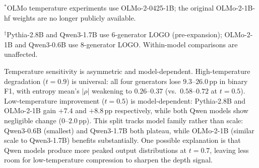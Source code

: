 \begin{table}[ht]
\centering
\caption{Depth classification under varying temperature (fixed top-$p$\,=\,0.9). Binary: gen-1 vs.\ gen-2+. LOGO evaluation; 95\% bootstrap CIs.$^{\ast}$$^{\dagger}$}
\label{tab:sampling-ablation}
\small
{}
\end{table}
\noindent\begin{minipage}{\columnwidth}
\scriptsize $^{\ast}$OLMo temperature experiments use OLMo-2-0425-1B; the original OLMo-2-1B-hf weights are no longer publicly available.\par\vspace{1pt}
$^{\dagger}$Pythia-2.8B and Qwen3-1.7B use 6-generator LOGO (pre-expansion); OLMo-2-1B and Qwen3-0.6B use 8-generator LOGO. Within-model comparisons are unaffected.
\end{minipage}\vspace{4pt}

 Temperature sensitivity is asymmetric and model-dependent. High-temperature degradation ($t{=}0.9$) is universal: all four generators lose $9.3$--$26.0$\,pp in binary F1, with entropy mean's $|\rho|$ weakening to $0.26$--$0.37$ (vs.\ $0.58$--$0.72$ at $t{=}0.5$). Low-temperature improvement ($t{=}0.5$) is model-dependent: Pythia-2.8B and OLMo-2-1B gain $+7.4$ and $+8.8$\,pp respectively, while both Qwen models show negligible change ($0$--$2.0$\,pp). This split tracks model family rather than scale: Qwen3-0.6B (smallest) and Qwen3-1.7B both plateau, while OLMo-2-1B (similar scale to Qwen3-1.7B) benefits substantially. One possible explanation is that Qwen models produce more peaked output distributions at $t{=}0.7$, leaving less room for low-temperature compression to sharpen the depth signal.

